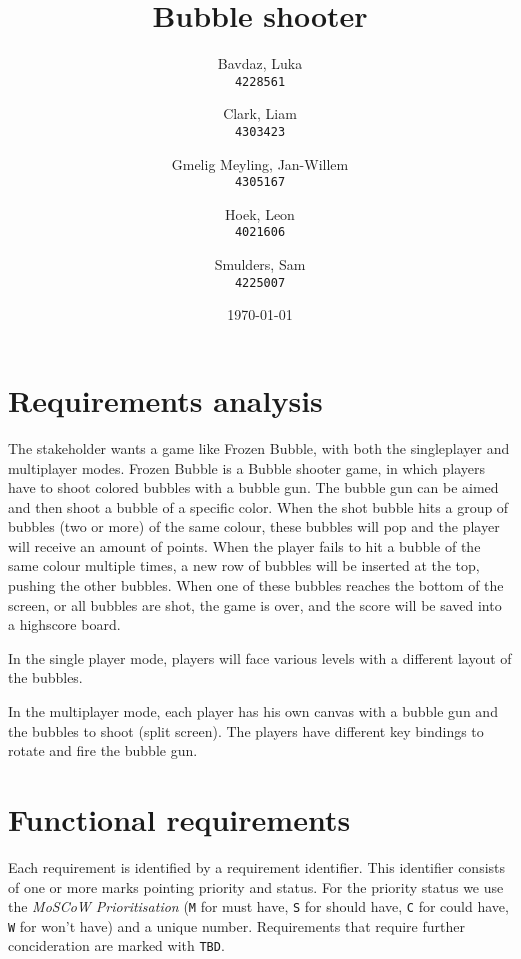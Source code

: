 \documentclass[a4paper]{article}
\title{Bubble shooter}
\author{
    Bavdaz, Luka\\
    \texttt{4228561}
    \and
    Clark, Liam\\
    \texttt{4303423}
    \and
    Gmelig Meyling, Jan-Willem\\
    \texttt{4305167}
    \and
    Hoek, Leon\\
    \texttt{4021606}
    \and
    Smulders, Sam\\
    \texttt{4225007}
}
\date{\today}
\begin{document}
\maketitle




\section{Requirements analysis}
The stakeholder wants a game like Frozen Bubble, with both the singleplayer and multiplayer modes. Frozen Bubble is a Bubble shooter game, in which players have to shoot colored bubbles with a bubble gun. The bubble gun can be aimed and then shoot a bubble of a specific color. When the shot bubble hits a group of bubbles (two or more) of the same colour, these bubbles will pop and the player will receive an amount of points. When the player fails to hit a bubble of the same colour multiple times, a new row of bubbles will be inserted at the top, pushing the other bubbles. When one of these bubbles reaches the bottom of the screen, or all bubbles are shot, the game is over, and the score will be saved into a highscore board.
\par In the single player mode, players will face various levels with a different layout of the bubbles.
\par In the multiplayer mode, each player has his own canvas with a bubble gun and the bubbles to shoot (split screen). The players have different key bindings to rotate and fire the bubble gun.



\section{Functional requirements}
Each requirement is identified by a requirement identifier. This identifier consists of one or more marks pointing priority and status. For the priority status we use the \textit{MoSCoW Prioritisation} \citep{moscow} (\texttt{M} for must have, \texttt{S} for should have, \texttt{C} for could have, \texttt{W} for won't have) and a unique number. Requirements that require further concideration are marked with \texttt{TBD}.
\end{document}
